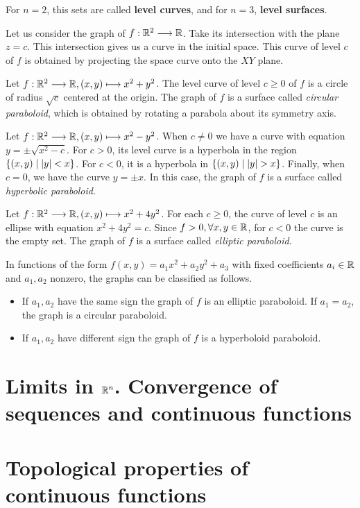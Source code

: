 \begin{note}
    For $n=2$, this sets are called \textbf{level curves}, and for $n=3$, \textbf{level surfaces}.
\end{note}

Let us consider the graph of $\appl{f}{\R^2}{\R}$. Take its intersection with the plane $z = c$. This intersection gives 
us a curve in the initial space. This curve of level $c$ of $f$ is obtained by projecting the space curve onto the $XY$
plane.

\begin{example}
    Let $\appl{f}{\R^2}{\R}, (x, y)\longmapsto x^2 + y^2$. The level curve of level $c\geq 0$ of $f$ is a circle of radius
    $\sqrt{c}$ centered at the origin. The graph of $f$ is a surface called \textit{circular paraboloid}, which is obtained
    by rotating a parabola about its symmetry axis.
\end{example}

\begin{example}
    Let $\appl{f}{\R^2}{\R}, (x, y)\longmapsto x^2 - y^2$. When $c\neq 0$ we have a curve with equation $y = \pm\sqrt{x^2 - c}$.
    For $c > 0$, its level curve is a hyperbola in the region $\{(x, y)\; | \; \abs{y} < x\}$. For $c < 0$, it is a hyperbola in
    $\{(x, y)\; | \;\abs{y} > x\}$. Finally, when $c = 0$, we have the curve $y = \pm x$. In this case, the graph of $f$ is a 
    surface called \textit{hyperbolic paraboloid}.
\end{example}

\begin{example}
    Let $\appl{f}{\R^2}{\R}, (x, y)\longmapsto x^2 + 4y^2$. For each $c\geq 0$, the curve of level $c$ is an ellipse with
    equation $x^2 + 4y^2 = c$. Since $f > 0, \forall x, y\in\R$, for $c < 0$ the curve is the empty set. The graph of $f$ is
    a surface called \textit{elliptic paraboloid}.
\end{example}

\begin{remark}
    In functions of the form $f(x, y) = a_1x^2 + a_2y^2 + a_3$ with fixed coefficients $a_i\in\R$ and $a_1, a_2$ nonzero, the
    graphs can be classified as follows.
    \begin{itemize}[itemsep = -2pt]
        \item If $a_1, a_2$ have the same sign the graph of $f$ is an elliptic paraboloid. If $a_1 = a_2$, the graph is a 
            circular paraboloid.
        \item If $a_1, a_2$ have different sign the graph of $f$ is a hyperboloid paraboloid.
    \end{itemize}
\end{remark}

\section{Limits in $\Rtn$. Convergence of sequences and continuous functions}

\section{Topological properties of continuous functions}
